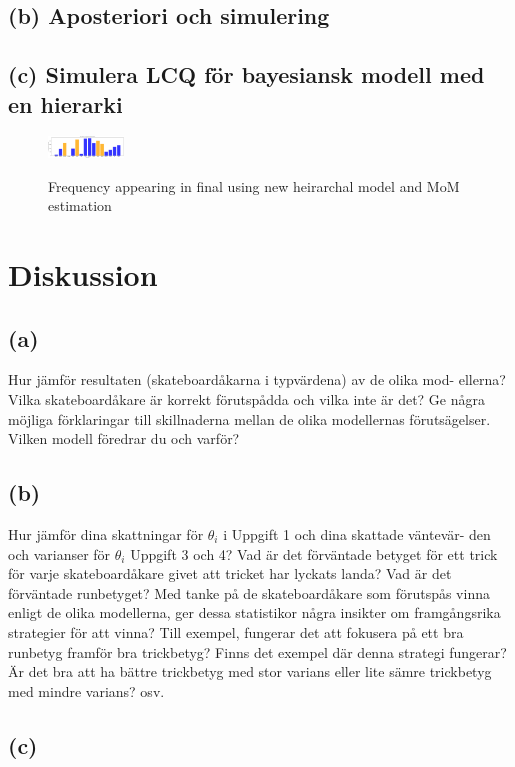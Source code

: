 \documentclass{assignment}
\begin{document}
\subsection*{(b) Aposteriori och simulering}

\subsection*{(c) Simulera LCQ för bayesiansk modell med en hierarki}

\begin{figure}
    \includegraphics[width = 20mm]{assets/new_theta_LCQ.png}
    \label{new theta lcq}
    \caption{Frequency appearing in final using new heirarchal model and MoM estimation}
\end{figure}
\section{Diskussion}
\subsection*{(a)} Hur jämför resultaten (skateboardåkarna i typvärdena) av de olika mod-
ellerna? Vilka skateboardåkare är korrekt förutspådda och vilka inte är det?
Ge några möjliga förklaringar till skillnaderna mellan de olika modellernas
förutsägelser. Vilken modell föredrar du och varför?

\subsection*{(b)}
Hur jämför dina skattningar för $\theta_i$ i Uppgift 1 och dina skattade väntevär-
den och varianser för $\theta_i$ Uppgift 3 och 4? Vad är det förväntade betyget
för ett trick för varje skateboardåkare givet att tricket har lyckats landa?
Vad är det förväntade runbetyget? Med tanke på de skateboardåkare som
förutspås vinna enligt de olika modellerna, ger dessa statistikor några insikter
om framgångsrika strategier för att vinna? Till exempel, fungerar det att
fokusera på ett bra runbetyg framför bra trickbetyg? Finns det exempel där
denna strategi fungerar? Är det bra att ha bättre trickbetyg med stor varians
eller lite sämre trickbetyg med mindre varians? osv.

\subsection*{(c)}
\end{document}
